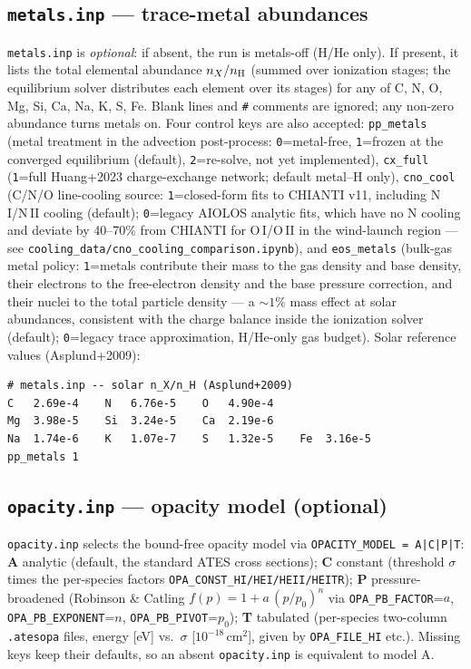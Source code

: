 \documentclass[english,a4paper]{kiseon_memo}
\begin{document}
\subsection{\texttt{metals.inp} --- trace-metal abundances}
\texttt{metals.inp} is \emph{optional}: if absent, the run is metals-off (H/He
only). If present, it lists the total elemental abundance $n_X/n_{\rm H}$ (summed
over ionization stages; the equilibrium solver distributes each element over its
stages) for any of C, N, O, Mg, Si, Ca, Na, K, S, Fe. Blank lines and \texttt{\#}
comments are ignored; any non-zero abundance turns metals on. Four control keys
are also accepted: \texttt{pp\_metals} (metal treatment in the advection
post-process: \texttt{0}=metal-free, \texttt{1}=frozen at the converged
equilibrium (default), \texttt{2}=re-solve, not yet implemented),
\texttt{cx\_full} (\texttt{1}=full Huang+2023 charge-exchange network; default
metal--H only), \texttt{cno\_cool} (C/N/O line-cooling source:
\texttt{1}=closed-form fits to CHIANTI v11, including N\,I/N\,II cooling
(default); \texttt{0}=legacy AIOLOS analytic fits, which have no N cooling and
deviate by 40--70\% from CHIANTI for O\,I/O\,II in the wind-launch region ---
see \texttt{cooling\_data/cno\_cooling\_comparison.ipynb}), and
\texttt{eos\_metals} (bulk-gas metal policy: \texttt{1}=metals contribute
their mass to the gas density and base density, their electrons to the
free-electron density and the base pressure correction, and their nuclei to
the total particle density --- a ${\sim}1\%$ mass effect at solar abundances,
consistent with the charge balance inside the ionization solver (default);
\texttt{0}=legacy trace approximation, H/He-only gas budget). Solar reference
values (Asplund+2009):
\begin{lstlisting}[style=cfg]
# metals.inp -- solar n_X/n_H (Asplund+2009)
C   2.69e-4    N   6.76e-5    O   4.90e-4
Mg  3.98e-5    Si  3.24e-5    Ca  2.19e-6
Na  1.74e-6    K   1.07e-7    S   1.32e-5    Fe  3.16e-5
pp_metals 1
\end{lstlisting}

\subsection{\texttt{opacity.inp} --- opacity model (optional)}
\texttt{opacity.inp} selects the bound-free opacity model via
\texttt{OPACITY\_MODEL = A|C|P|T}: \textbf{A} analytic (default, the standard
ATES cross sections); \textbf{C} constant (threshold $\sigma$ times the
per-species factors \texttt{OPA\_CONST\_HI/HEI/HEII/HEITR}); \textbf{P}
pressure-broadened (Robinson \& Catling $f(p)=1+a\,(p/p_0)^n$ via
\texttt{OPA\_PB\_FACTOR}=$a$, \texttt{OPA\_PB\_EXPONENT}=$n$,
\texttt{OPA\_PB\_PIVOT}=$p_0$); \textbf{T} tabulated (per-species two-column
\texttt{.atesopa} files, energy [eV] vs.\ $\sigma$ [$10^{-18}$\,cm$^2$], given by
\texttt{OPA\_FILE\_HI} etc.). Missing keys keep their defaults, so an absent
\texttt{opacity.inp} is equivalent to model A.
\end{document}
